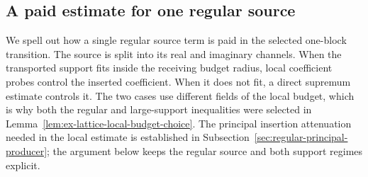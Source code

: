 \subsection{A paid estimate for one regular source}
\label{sec:ex-lattice-trace-regular-atom}

We spell out how a single regular source term is paid in the selected
one-block transition. The source is split into its real and imaginary
channels. When the transported support fits inside the receiving budget
radius, local coefficient probes control the inserted coefficient. When it
does not fit, a direct supremum estimate controls it. The two cases use
different fields of the local budget, which is why both the regular and
large-support inequalities were selected in
Lemma~\ref{lem:ex-lattice-local-budget-choice}. The principal insertion
attenuation needed in the local estimate is established in
Subsection~\ref{sec:regular-principal-producer}; the argument below keeps the
regular source and both support regimes explicit.

